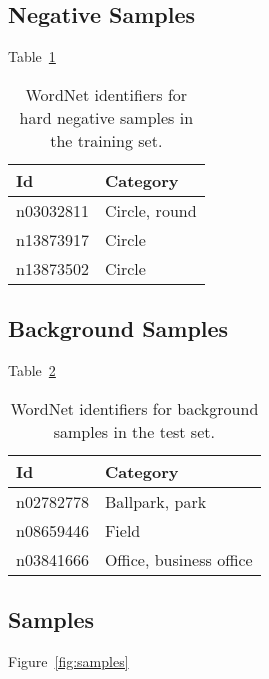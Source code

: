 \documentclass{llncs}
\begin{document}
{{		}

		\subsection{Negative Samples} {

			Table~\ref{tab:negative_samples}

			\begin{table}
				\centering
				\caption{WordNet identifiers for hard negative samples in the training set.}
				\label{tab:negative_samples}
				\begin{tabularx}{\textwidth}{lX}
					\toprule
					\textbf{Id} & \textbf{Category} \\
					\midrule
						n03032811 & Circle, round \\
						n13873917 & Circle \\
						n13873502 & Circle \\
					\bottomrule
				\end{tabularx}
			\end{table}

		}

		\subsection{Background Samples} {

			Table~\ref{tab:background_samples}

			\begin{table}
				\centering
				\caption{WordNet identifiers for background samples in the test set.}
				\label{tab:background_samples}
				\begin{tabularx}{\textwidth}{lX}
					\toprule
					\textbf{Id} & \textbf{Category} \\
					\midrule
						n02782778 & Ballpark, park \\
						n08659446 & Field \\
						n03841666 & Office, business office \\
					\bottomrule
				\end{tabularx}
			\end{table}

		}

		\subsection{Samples} {

			Figure~\ref{fig:samples}

			\newcommand{\samplefigurewidth}{0.45\textwidth}
			\newcommand{\samplewidth}{0.1\textwidth}
			\newcommand{\sampleheight}{1.5cm}
			\newcommand{\includesample}[1]{\hspace{0.1cm}\texttt{[image: images/training/\#1]}}

}}
\end{document}
